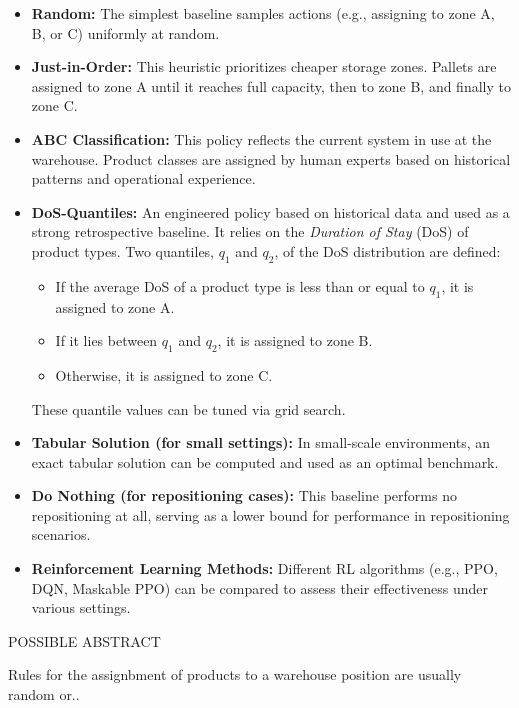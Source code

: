 \documentclass[a4paper,twoside,11pt]{article}
\begin{document}
\begin{itemize}
    \item \textbf{Random:} The simplest baseline samples actions (e.g., assigning to zone A, B, or C) uniformly at random.

    \item \textbf{Just-in-Order:} This heuristic prioritizes cheaper storage zones. Pallets are assigned to zone A until it reaches full capacity, then to zone B, and finally to zone C.

    \item \textbf{ABC Classification:} This policy reflects the current system in use at the warehouse. Product classes are assigned by human experts based on historical patterns and operational experience.

    \item \textbf{DoS-Quantiles:} An engineered policy based on historical data and used as a strong retrospective baseline. It relies on the \textit{Duration of Stay} (DoS) of product types. Two quantiles, $q_1$ and $q_2$, of the DoS distribution are defined:
    \begin{itemize}
        \item If the average DoS of a product type is less than or equal to $q_1$, it is assigned to zone A.
        \item If it lies between $q_1$ and $q_2$, it is assigned to zone B.
        \item Otherwise, it is assigned to zone C.
    \end{itemize}
    These quantile values can be tuned via grid search.
    
    \item \textbf{Tabular Solution (for small settings):} In small-scale environments, an exact tabular solution can be computed and used as an optimal benchmark.

    \item \textbf{Do Nothing (for repositioning cases):} This baseline performs no repositioning at all, serving as a lower bound for performance in repositioning scenarios.

    \item \textbf{Reinforcement Learning Methods:} Different RL algorithms (e.g., PPO, DQN, Maskable PPO) can be compared to assess their effectiveness under various settings.
\end{itemize}

POSSIBLE ABSTRACT

Rules for the assignbment of products to a warehouse position are usually random or..
\end{document}
